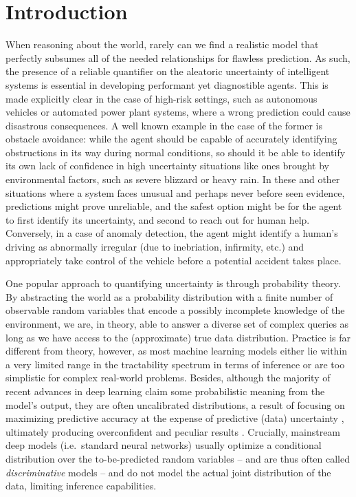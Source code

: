 \chapter{Introduction}

When reasoning about the world, rarely can we find a realistic model that perfectly subsumes all of
the needed relationships for flawless prediction. As such, the presence of a reliable quantifier on
the aleatoric uncertainty of intelligent systems is essential in developing performant yet
diagnostible agents. This is made explicitly clear in the case of high-risk settings, such as
autonomous vehicles or automated power plant systems, where a wrong prediction could cause
disastrous consequences. A well known example in the case of the former is obstacle avoidance:
while the agent should be capable of accurately identifying obstructions in its way during normal
conditions, so should it be able to identify its own lack of confidence in high uncertainty
situations like ones brought by environmental factors, such as severe blizzard or heavy rain. In
these and other situations where a system faces unusual and perhaps never before seen evidence,
predictions might prove unreliable, and the safest option might be for the agent to first identify
its uncertainty, and second to reach out for human help. Conversely, in a case of anomaly
detection, the agent might identify a human's driving as abnormally irregular (due to inebriation,
infirmity, etc.) and appropriately take control of the vehicle before a potential accident takes
place.

One popular approach to quantifying uncertainty is through probability theory. By abstracting the
world as a probability distribution with a finite number of observable random variables that encode
a possibly incomplete knowledge of the environment, we are, in theory, able to answer a diverse set
of complex queries as long as we have access to the (approximate) true data distribution. Practice
is far different from theory, however, as most machine learning models either lie within a very
limited range in the tractability spectrum in terms of inference \citep{pclec} or are too
simplistic for complex real-world problems. Besides, although the majority of recent advances in
deep learning claim some probabilistic meaning from the model's output, they are often uncalibrated
distributions, a result of focusing on maximizing predictive accuracy at the expense of predictive
(data) uncertainty \citep{guo17,yaniv19,chernikova19}, ultimately producing overconfident and
peculiar results \citep{szegedy13,wei18,su19,chernikova19}. Crucially, mainstream deep models
(i.e.\ standard neural networks) usually optimize a conditional distribution over the
to-be-predicted random variables -- and are thus often called \emph{discriminative} models -- and
do not model the actual joint distribution of the data, limiting inference capabilities.

